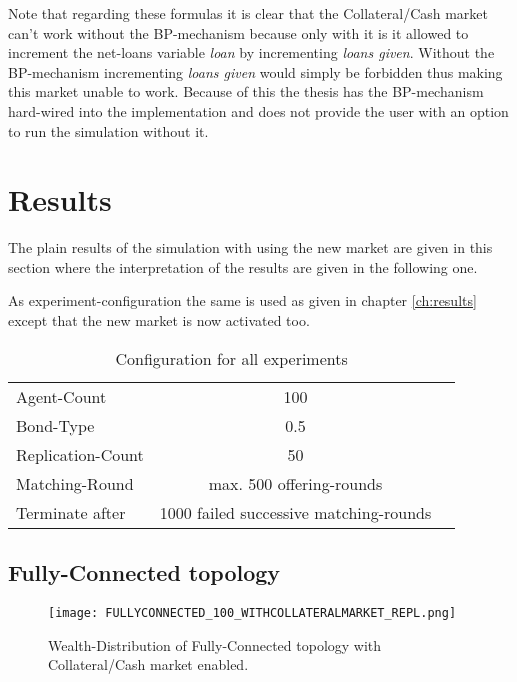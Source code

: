\documentclass[Bachelorarbeit.tex]{subfiles}
\begin{document}
Note that regarding these formulas it is clear that the Collateral/Cash market can't work without the BP-mechanism because only with it is it allowed to increment the net-loans variable \textit{loan} by incrementing \textit{loans given}. Without the BP-mechanism incrementing \textit{loans given} would simply be forbidden thus making this market unable to work. Because of this the thesis has the BP-mechanism hard-wired into the implementation and does not provide the user with an option to run the simulation without it.

\section{Results}
The plain results of the simulation with using the new market are given in this section where the interpretation of the results are given in the following one.

\medskip

As experiment-configuration the same is used as given in chapter \ref{ch:results} except that the new market is now activated too.

\begin{table}[H]
	\centering
	\caption{Configuration for all experiments}
	\begin{tabular} { l c r }
		\hline
		Agent-Count & 100 \\
		Bond-Type & 0.5 \\
		Replication-Count & 50 \\
		Matching-Round & max. 500 offering-rounds \\
		Terminate after & 1000 failed successive matching-rounds \\
		\hline
	\end{tabular}
\end{table}

\subsection{Fully-Connected topology}

\begin{figure}[H]
	\centering
  \texttt{[image: FULLYCONNECTED\_100\_WITHCOLLATERALMARKET\_REPL.png]}
	\caption{Wealth-Distribution of Fully-Connected topology with Collateral/Cash market enabled.}
	\label{fig:wealth_FULLYCONNECTED_100_WITHCOLLATERALMARKET_REPL}
\end{figure}
\end{document}
